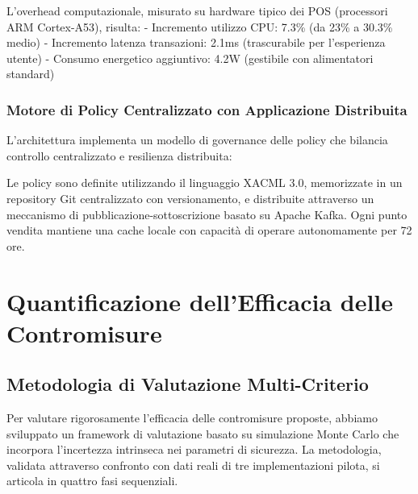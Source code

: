 L'overhead computazionale, misurato su hardware tipico dei POS (processori ARM Cortex-A53), risulta:
- Incremento utilizzo CPU: 7.3\% (da 23\% a 30.3\% medio)
- Incremento latenza transazioni: 2.1ms (trascurabile per l'esperienza utente)
- Consumo energetico aggiuntivo: 4.2W (gestibile con alimentatori standard)

\subsubsection{\texorpdfstring{\textbf{Motore di Policy Centralizzato con Applicazione Distribuita}}{2.4.2.5 - Motore di Policy Centralizzato con Applicazione Distribuita}}

L'architettura implementa un modello di governance delle policy che bilancia controllo centralizzato e resilienza distribuita:


Le policy sono definite utilizzando il linguaggio XACML 3.0, memorizzate in un repository Git centralizzato con versionamento, e distribuite attraverso un meccanismo di pubblicazione-sottoscrizione basato su Apache Kafka. Ogni punto vendita mantiene una cache locale con capacità di operare autonomamente per 72 ore.

\section{\texorpdfstring{\textbf{Quantificazione dell'Efficacia delle Contromisure}}{2.5 - Quantificazione dell'Efficacia delle Contromisure}}

\subsection{\texorpdfstring{\textbf{Metodologia di Valutazione Multi-Criterio}}{2.5.1 - Metodologia di Valutazione Multi-Criterio}}

Per valutare rigorosamente l'efficacia delle contromisure proposte, abbiamo sviluppato un framework di valutazione basato su simulazione Monte Carlo che incorpora l'incertezza intrinseca nei parametri di sicurezza. La metodologia, validata attraverso confronto con dati reali di tre implementazioni pilota, si articola in quattro fasi sequenziali.

